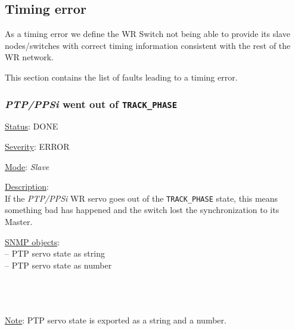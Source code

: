 \subsection{Timing error}
\label{sec:timing_fail}
As a timing error we define the WR Switch not being able to provide its slave
nodes/switches with correct timing information consistent with the rest of the
WR network.

\noindent This section contains the list of faults leading to a timing error.

\subsubsection{\bf \emph{PTP/PPSi} went out of \texttt{TRACK\_PHASE}}
		\label{fail:timing:ppsi_track_phase}
    \begin{pck_descr}
			\item [] \underline{Status}: DONE
			\item [] \underline{Severity}: ERROR
			\item [] \underline{Mode}: \emph{Slave}
			\item [] \underline{Description}:\\
				If the \emph{PTP/PPSi} WR servo goes out of the \texttt{TRACK\_PHASE}
				state, this means something bad has happened and the switch lost the
				synchronization to its Master.
			\item [] \underline{SNMP objects}:\\
        {\footnotesize
				 -- PTP servo state as string\\
				 -- PTP servo state as number\\
				\\
				 \\
				 \\
         }

			\item [] \underline{Note}: PTP servo state is exported as a string and a number.
		\end{pck_descr}

